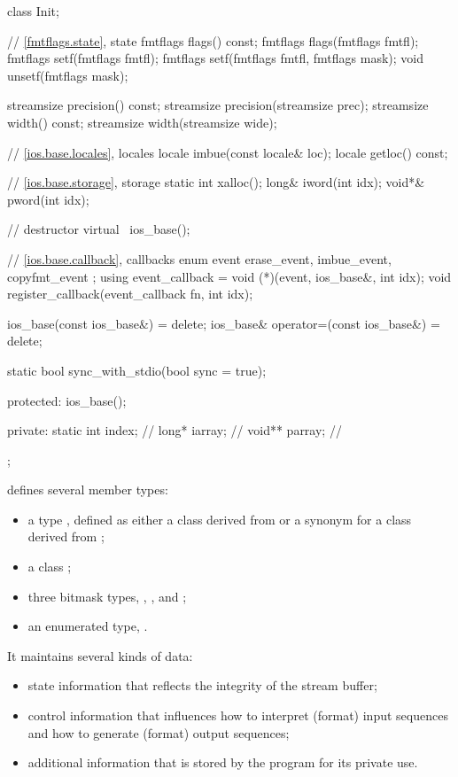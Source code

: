 \begin{codeblock}
{{    class Init;

    // \ref{fmtflags.state},  state
    fmtflags flags() const;
    fmtflags flags(fmtflags fmtfl);
    fmtflags setf(fmtflags fmtfl);
    fmtflags setf(fmtflags fmtfl, fmtflags mask);
    void unsetf(fmtflags mask);

    streamsize precision() const;
    streamsize precision(streamsize prec);
    streamsize width() const;
    streamsize width(streamsize wide);

    // \ref{ios.base.locales}, locales
    locale imbue(const locale& loc);
    locale getloc() const;

    // \ref{ios.base.storage}, storage
    static int xalloc();
    long&  iword(int idx);
    void*& pword(int idx);

    // destructor
    virtual ~ios_base();

    // \ref{ios.base.callback}, callbacks
    enum event { erase_event, imbue_event, copyfmt_event };
    using event_callback = void (*)(event, ios_base&, int idx);
    void register_callback(event_callback fn, int idx);

    ios_base(const ios_base&) = delete;
    ios_base& operator=(const ios_base&) = delete;

    static bool sync_with_stdio(bool sync = true);

  protected:
    ios_base();

  private:
    static int index;           // \expos
    long*  iarray;              // \expos
    void** parray;              // \expos
  };
}
\end{codeblock}

\pnum
{}
defines several member types:
\begin{itemize}
\item a type , defined as either a class derived from
 or a synonym for a class derived from ;

\item a class ;

\item three bitmask types, , , and ;

\item an enumerated type, .
\end{itemize}

\pnum
It maintains several kinds of data:
\begin{itemize}
\item
state information that reflects the integrity of the stream buffer;
\item
control information that influences how to interpret (format) input
sequences and how to generate (format) output sequences;
\item
additional information that is stored by the program for its private use.
\end{itemize}

